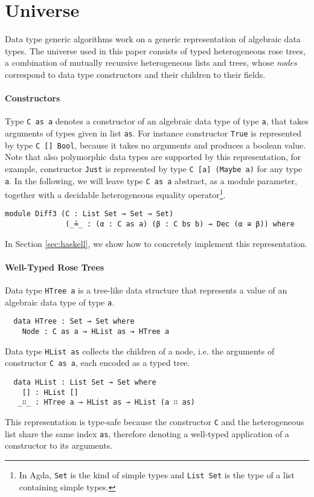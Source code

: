 \documentclass{sigplanconf}
\theoremstyle{plain}
\begin{document}
\section{Universe}
\label{section:universe}
Data type generic algorithms work on a generic representation of
algebraic data types.
%
The universe used in this paper consists of typed heterogeneous rose
trees, a combination of mutually recursive heterogeneous lists and
trees, whose \emph{nodes} correspond to data type constructors and
their children to their fields.

\paragraph{Constructors}
Type \texttt{C as a} denotes a constructor of an algebraic data type
of type \texttt{a}, that takes arguments of types given in list
\texttt{as}.
%
For instance constructor \texttt{True} is represented by type \texttt{C []
  Bool}, because it takes no arguments and produces a boolean
value.
%
Note that also polymorphic data types are supported by this
representation, for example, constructor \texttt{Just} is represented
by type \texttt{C [a] (Maybe a)} for any type \texttt{a}.
%
In the following, we will leave type \texttt{C as a} abstract, as a
module parameter, together with a decidable heterogeneous equality
operator\footnote{In Agda, \texttt{Set} is the kind of simple types
  and \texttt{List Set} is the type of a list containing simple
  types.}.

\begin{verbatim}
module Diff3 (C : List Set → Set → Set) 
              (_≟_ : (α : C as a) (β : C bs b) → Dec (α ≅ β)) where
\end{verbatim}
In Section \ref{sec:haskell}, we show how to concretely implement this
representation.

\paragraph{Well-Typed Rose Trees}
Data type \texttt{HTree a} is a tree-like data structure that
represents a value of an algebraic data type of type \texttt{a}.
\begin{verbatim}
  data HTree : Set → Set where
    Node : C as a → HList as → HTree a
\end{verbatim}
%
Data type \texttt{HList as} collects the children of a node, i.e. the
arguments of constructor \texttt{C as a}, each encoded as a typed
tree.
%
\begin{verbatim}
  data HList : List Set → Set where
    [] : HList []
   _∷_ : HTree a → HList as → HList (a ∷ as)
\end{verbatim}
%
This representation is type-safe because the constructor
\texttt{C} and the heterogeneous list share the same index
\texttt{as}, therefore denoting a well-typed application of a
constructor to its arguments.
% 
\end{document}
